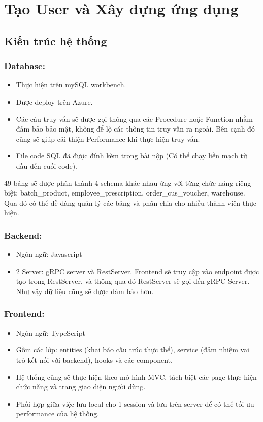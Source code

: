 \section{Tạo User và Xây dựng ứng dụng}
\subsection{Kiến trúc hệ thống}
\subsubsection{Database:}
\begin{itemize}
    \item Thực hiện trên mySQL workbench.
    \item Được deploy trên Azure.
    \item Các câu truy vấn sẽ được gọi thông qua các Procedure hoặc Function nhằm đảm bảo bảo mật, không để lộ các thông tin truy vấn ra ngoài. Bên cạnh đó cũng sẽ giúp cải thiện Performance khi thực hiện truy vấn. 
    \item File code SQL đã được đính kèm trong bài nộp (Có thể chạy liền mạch từ đầu đến cuối code).
\end{itemize}
49 bảng sẽ được phân thành 4 schema khác nhau ứng với từng chức năng riêng biệt: batch\_product, employee\_prescription, order\_cus\_voucher, warehouse. Qua đó có thể dễ dàng quản lý các bảng và phân chia cho nhiều thành viên thực hiện. 
\subsubsection{Backend:}
\begin{itemize}
    \item Ngôn ngữ: Javascript
    \item 2 Server: gRPC server và RestServer. Frontend sẽ truy cập vào endpoint được tạo trong RestServer, và thông qua đó RestServer sẽ gọi đến gRPC Server. Như vậy dữ liệu cũng sẽ được đảm bảo hơn. 
\end{itemize}
\subsubsection{Frontend:}
\begin{itemize}
    \item Ngôn ngữ: TypeScript
    \item Gồm các lớp: entities (khai báo cấu trúc thực thể), service (đảm nhiệm vai trò kết nối với backend), hooks và các component.
    \item Hệ thống cũng sẽ thực hiện theo mô hình MVC, tách biệt các page thực hiện chức năng và trang giao diện người dùng. 
    \item Phối hợp giữa việc lưu local cho 1 session và lưu trên server để có thể tối ưu performance của hệ thống.
\end{itemize}




